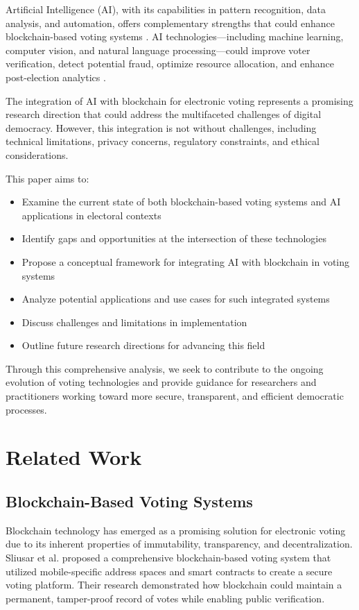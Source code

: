 \documentclass[conference]{IEEEtran}
\begin{document}
Artificial Intelligence (AI), with its capabilities in pattern recognition, data analysis, and automation, offers complementary strengths that could enhance blockchain-based voting systems \cite{b3}. AI technologies—including machine learning, computer vision, and natural language processing—could improve voter verification, detect potential fraud, optimize resource allocation, and enhance post-election analytics \cite{b3}.

The integration of AI with blockchain for electronic voting represents a promising research direction that could address the multifaceted challenges of digital democracy. However, this integration is not without challenges, including technical limitations, privacy concerns, regulatory constraints, and ethical considerations.

This paper aims to:
\begin{itemize}
    \item Examine the current state of both blockchain-based voting systems and AI applications in electoral contexts
    \item Identify gaps and opportunities at the intersection of these technologies
    \item Propose a conceptual framework for integrating AI with blockchain in voting systems
    \item Analyze potential applications and use cases for such integrated systems
    \item Discuss challenges and limitations in implementation
    \item Outline future research directions for advancing this field
\end{itemize}

Through this comprehensive analysis, we seek to contribute to the ongoing evolution of voting technologies and provide guidance for researchers and practitioners working toward more secure, transparent, and efficient democratic processes.

\section{Related Work}
\subsection{Blockchain-Based Voting Systems}
Blockchain technology has emerged as a promising solution for electronic voting due to its inherent properties of immutability, transparency, and decentralization. Sliusar et al. \cite{b4} proposed a comprehensive blockchain-based voting system that utilized mobile-specific address spaces and smart contracts to create a secure voting platform. Their research demonstrated how blockchain could maintain a permanent, tamper-proof record of votes while enabling public verification.
\end{document}
